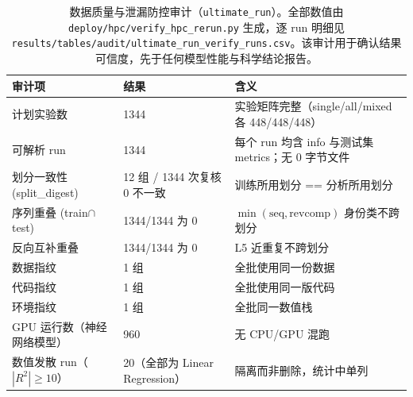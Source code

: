 \begin{table}[htbp]
\centering
\footnotesize
\caption{数据质量与泄漏防控审计（\texttt{ultimate\_run}）。全部数值由 \texttt{deploy/hpc/verify\_hpc\_rerun.py} 生成，逐 run 明细见 \texttt{results/tables/audit/ultimate\_run\_verify\_runs.csv}。该审计用于确认结果可信度，先于任何模型性能与科学结论报告。}
\label{tab:dataquality}
\begin{tabular}{lll}
\toprule
审计项 & 结果 & 含义 \\
\midrule
计划实验数 & 1344 & 实验矩阵完整（single/all/mixed 各 448/448/448） \\
可解析 run & 1344 & 每个 run 均含 info 与测试集 metrics；无 0 字节文件 \\
划分一致性 (split\_digest) & 12 组 / 1344 次复核 0 不一致 & 训练所用划分 == 分析所用划分 \\
序列重叠 (train$\cap$test) & 1344/1344 为 0 & $\min(\mathrm{seq},\mathrm{revcomp})$ 身份类不跨划分 \\
反向互补重叠 & 1344/1344 为 0 & L5 近重复不跨划分 \\
数据指纹 & 1 组 & 全批使用同一份数据 \\
代码指纹 & 1 组 & 全批使用同一版代码 \\
环境指纹 & 1 组 & 全批同一数值栈 \\
GPU 运行数（神经网络模型） & 960 & 无 CPU/GPU 混跑 \\
数值发散 run（$|R^{2}|\ge10$） & 20（全部为 Linear Regression） & 隔离而非删除，统计中单列 \\
\bottomrule
\end{tabular}
\end{table}
